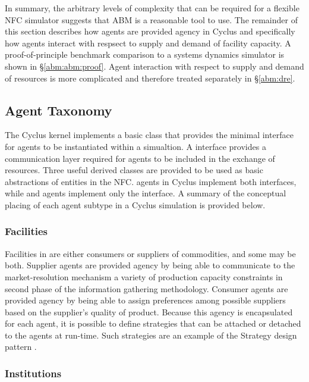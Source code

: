 In summary, the arbitrary levels of complexity that can be required for a
flexible NFC simulator suggests that ABM is a reasonable tool to use. The
remainder of this section describes how agents are provided agency in Cyclus and
specifically how agents interact with respsect to supply and demand of facility
capacity. A proof-of-principle benchmark comparison to a systems dynamics
simulator is shown in \S \ref{abm:abm:proof}. Agent interaction with respect to
supply and demand of resources is more complicated and therefore treated
separately in \S \ref{abm:dre}.

\subsection{Agent Taxonomy}\label{abm:abm:tax}

The Cyclus kernel implements a basic  class that provides the
minimal interface for agents to be instantiated within a simualtion. A
 interface provides a communication layer required for agents to be
included in the exchange of resources. Three useful derived classes are provided
to be used as basic abstractions of entities in the NFC.  agents
in Cyclus implement both interfaces, while  and 
agents implement only the  interface.  A summary of the conceptual
placing of each agent subtype in a Cyclus simulation is provided below.

\subsubsection{Facilities}

Facilities in \Cyclus are either consumers or suppliers of commodities, and some
may be both. Supplier agents are provided agency by being able to communicate to
the market-resolution mechanism a variety of production capacity constraints in
second phase of the information gathering methodology. Consumer agents are
provided agency by being able to assign preferences among possible suppliers
based on the supplier's quality of product. Because this agency is encapsulated
for each agent, it is possible to define strategies that can be attached or
detached to the agents at run-time. Such strategies are an example of the
Strategy design pattern \cite{vlissides_design_1995}.

\subsubsection{Institutions}

